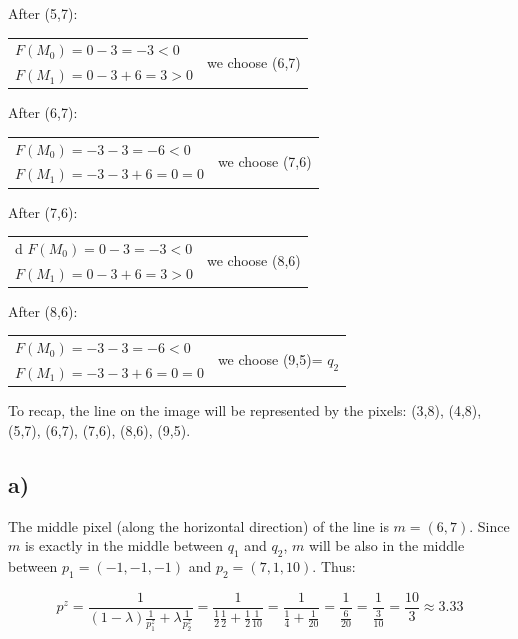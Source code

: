 \documentclass[tikz,14pt,fleqn]{article}
\begin{document}
After (5,7):

\begin{tabular}{ll}
    $F(M_0) = 0 -3 = -3 < 0$ &  \multirow{2}{*}{we choose (6,7)}\\
    $F(M_1) = 0 -3 + 6= 3 > 0$ & 
\end{tabular}

After (6,7):

\begin{tabular}{ll}
    $F(M_0) = -3 -3 = -6 < 0 $ &  \multirow{2}{*}{we choose (7,6)}\\
    $F(M_1) = -3 -3 + 6= 0 = 0$ & 
\end{tabular}

After (7,6):

\begin{tabular}{ll}d
    $F(M_0) = 0 -3 = -3 < 0$ &  \multirow{2}{*}{we choose (8,6)}\\
    $F(M_1) = 0 -3 + 6= 3 > 0$ & 
\end{tabular}

After (8,6):

\begin{tabular}{ll}
    $F(M_0) = -3 -3 = -6 < 0$ &  \multirow{2}{*}{we choose (9,5)= $q_2$}\\
    $F(M_1) = -3 -3 + 6= 0 = 0$  & 
\end{tabular}


To recap, the line on the image will be represented by the pixels:
(3,8), (4,8), (5,7), (6,7), (7,6), (8,6), (9,5).

\subsection*{a)}
The middle pixel (along the horizontal direction) of the line is $m = (6,7)$.
Since $m$ is exactly in the middle between $q_1$ and $q_2$, $m$ will be also in the middle between $p_1 = (-1,-1,-1)$ and $p_2 = (7,1,10)$.
Thus:

\[
p^z = \frac{1}{(1-\lambda)\frac{1}{p_1^z}+\lambda\frac{1}{p_2^z}}
 = \frac{1}{\frac{1}{2}\frac{1}{2}+\frac{1}{2}\frac{1}{10}} = \frac{1}{\frac{1}{4}+\frac{1}{20}} =  \frac{1}{\frac{6}{20}} = \frac{1}{\frac{3}{10}} = \frac{10}{3} \approx 3.33
\]
\end{document}
